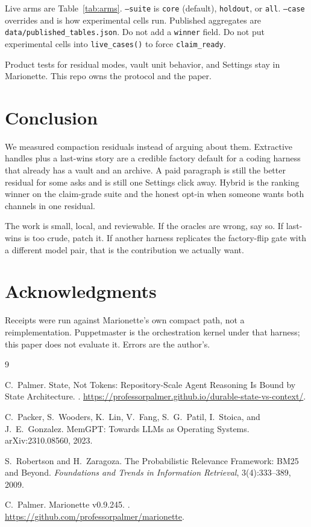 \documentclass[11pt]{article}
\begin{document}
Live arms are Table~\ref{tab:arms}. \texttt{--suite} is
\texttt{core} (default), \texttt{holdout}, or \texttt{all}.
\texttt{--case} overrides and is how experimental cells run.
Published aggregates are \texttt{data/published\_tables.json}. Do not
add a \texttt{winner} field. Do not put experimental cells into
\texttt{live\_cases()} to force \texttt{claim\_ready}.

Product tests for residual modes, vault unit behavior, and Settings
stay in Marionette. This repo owns the protocol and the paper.

\section{Conclusion}
\label{sec:concl}

We measured compaction residuals instead of arguing about them.
Extractive handles plus a last-wins story are a credible factory
default for a coding harness that already has a vault and an archive.
A paid paragraph is still the better residual for some asks and is
still one Settings click away. Hybrid is the ranking winner on the
claim-grade suite and the honest opt-in when someone wants both
channels in one residual.

The work is small, local, and reviewable. If the oracles are wrong,
say so. If last-wins is too crude, patch it. If another harness
replicates the factory-flip gate with a different model pair, that
is the contribution we actually want.

\section*{Acknowledgments}

Receipts were run against Marionette's own compact path, not a
reimplementation. Puppetmaster is the orchestration kernel under that
harness; this paper does not evaluate it. Errors are the author's.

\begin{thebibliography}{9}

C.~Palmer.
\newblock State, Not Tokens: Repository-Scale Agent Reasoning Is Bound by
  State Architecture.
.
\newblock \url{https://professorpalmer.github.io/durable-state-vs-context/}.

C.~Packer, S.~Wooders, K.~Lin, V.~Fang, S.~G.~Patil, I.~Stoica, and
  J.~E.~Gonzalez.
\newblock MemGPT: Towards LLMs as Operating Systems.
\newblock arXiv:2310.08560, 2023.

S.~Robertson and H.~Zaragoza.
\newblock The Probabilistic Relevance Framework: BM25 and Beyond.
\newblock \emph{Foundations and Trends in Information Retrieval},
  3(4):333--389, 2009.

C.~Palmer.
\newblock Marionette v0.9.245.
.
\newblock \url{https://github.com/professorpalmer/marionette}.

\end{thebibliography}
\end{document}
